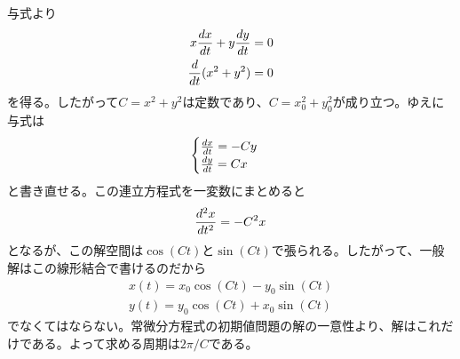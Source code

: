 \begin{sol}
与式より
\begin{align*}
  x \frac{dx}{dt} + y \frac{dy}{dt} &= 0 \\
  \frac{d}{dt}(x^2 + y^2) &= 0
\end{align*}
を得る。したがって$C = x^2 + y^2$は定数であり、$C = x_0^2 + y_0^2$が成り立つ。ゆえに与式は
\[
\begin{cases}
  \frac{dx}{dt} = - Cy \\
    \frac{dy}{dt} = Cx
\end{cases}
\]
と書き直せる。この連立方程式を一変数にまとめると
\[
\frac{d^2 x}{dt^2} = - C^2 x
\]
となるが、この解空間は$\cos (C t)$と$\sin (Ct)$で張られる。したがって、一般解はこの線形結合で書けるのだから
\begin{align*}
  x(t) = x_0 \cos(Ct) - y_0 \sin (Ct) \\
  y(t) = y_0 \cos(Ct) + x_0 \sin (Ct)
\end{align*}
でなくてはならない。常微分方程式の初期値問題の解の一意性より、解はこれだけである。よって求める周期は$2\pi / C$である。
\end{sol}

\newpage


